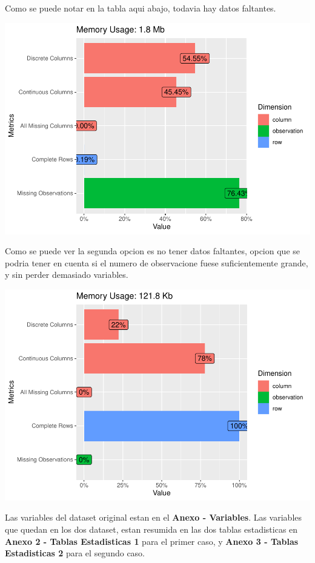 \documentclass[
]{article}
\begin{document}
Como se puede notar en la tabla aqui abajo, todavia hay datos faltantes.

\includegraphics{04_Stat_An_files/figure-latex/unnamed-chunk-3-1.pdf}

Como se puede ver la segunda opcion es no tener datos faltantes, opcion
que se podria tener en cuenta si el numero de observacione fuese
suficientemente grande, y sin perder demasiado variables.

\includegraphics{04_Stat_An_files/figure-latex/unnamed-chunk-4-1.pdf}

Las variables del dataset original estan en el \textbf{Anexo -
Variables}. Las variables que quedan en los dos dataset, estan resumida
en las dos tablas estadisticas en \textbf{Anexo 2 - Tablas Estadisticas
1} para el primer caso, y \textbf{Anexo 3 - Tablas Estadisticas 2} para
el segundo caso.
\end{document}
